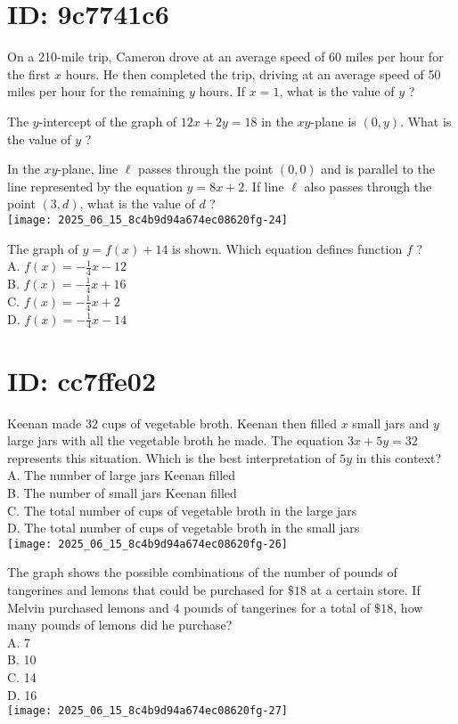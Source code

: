 \section*{ID: 9c7741c6}
On a 210-mile trip, Cameron drove at an average speed of 60 miles per hour for the first $x$ hours. He then completed the trip, driving at an average speed of 50 miles per hour for the remaining $y$ hours. If $x=1$, what is the value of $y$ ?

The $y$-intercept of the graph of $12 x+2 y=18$ in the $x y$-plane is $(0, y)$. What is the value of $y$ ?

In the $x y$-plane, line $\ell$ passes through the point $(0,0)$ and is parallel to the line represented by the equation $y=8 x+2$. If line $\ell$ also passes through the point $(3, d)$, what is the value of $d$ ?\\
\texttt{[image: 2025\_06\_15\_8c4b9d94a674ec08620fg-24]}

The graph of $y=f(x)+14$ is shown. Which equation defines function $f$ ?\\
A. $f(x)=-\frac{1}{4} x-12$\\
B. $f(x)=-\frac{1}{4} x+16$\\
C. $f(x)=-\frac{1}{4} x+2$\\
D. $f(x)=-\frac{1}{4} x-14$

\section*{ID: cc7ffe02}
Keenan made 32 cups of vegetable broth. Keenan then filled $x$ small jars and $y$ large jars with all the vegetable broth he made. The equation $3 x+5 y=32$ represents this situation. Which is the best interpretation of $5 y$ in this context?\\
A. The number of large jars Keenan filled\\
B. The number of small jars Keenan filled\\
C. The total number of cups of vegetable broth in the large jars\\
D. The total number of cups of vegetable broth in the small jars\\
\texttt{[image: 2025\_06\_15\_8c4b9d94a674ec08620fg-26]}

The graph shows the possible combinations of the number of pounds of tangerines and lemons that could be purchased for $\$ 18$ at a certain store. If Melvin purchased lemons and 4 pounds of tangerines for a total of $\$ 18$, how many pounds of lemons did he purchase?\\
A. 7\\
B. 10\\
C. 14\\
D. 16\\
\texttt{[image: 2025\_06\_15\_8c4b9d94a674ec08620fg-27]}

